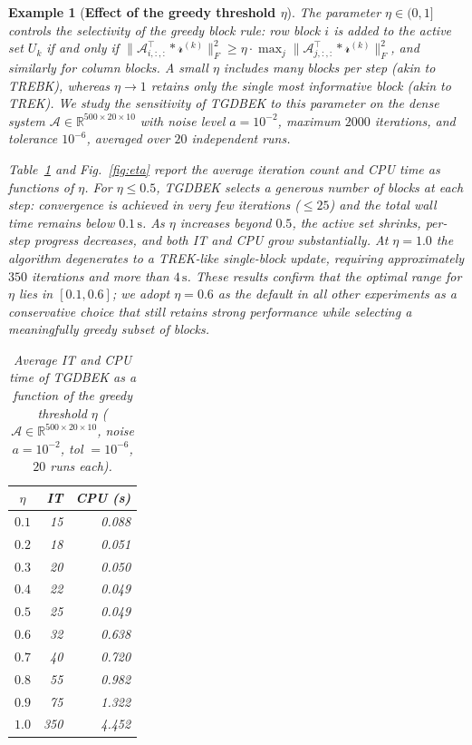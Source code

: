 \documentclass[11pt]{article}
\newtheorem{example}[theorem]{Example}
\def\fm#1{\mathcal{#1}}
\begin{document}
\begin{example}[\textbf{Effect of the greedy threshold $\eta$}] \label{ex:eta}
The parameter $\eta \in (0,1]$ controls the selectivity of the greedy block rule: row block $i$ is added to the active set $U_k$ if and only if $\|\fm A_{i,:,:}^\top * \fm r^{(k)}\|_F^2 \geq \eta \cdot \max_j \|\fm A_{j,:,:}^\top * \fm r^{(k)}\|_F^2$, and similarly for column blocks. A small $\eta$ includes many blocks per step (akin to TREBK), whereas $\eta \to 1$ retains only the single most informative block (akin to TREK). We study the sensitivity of TGDBEK to this parameter on the dense system $\fm A \in \mathbb{R}^{500\times20\times10}$ with noise level $a=10^{-2}$, maximum $2000$ iterations, and tolerance $10^{-6}$, averaged over $20$ independent runs.

Table~\ref{tab:eta} and Fig.~\ref{fig:eta} report the average iteration count and CPU time as functions of $\eta$. For $\eta \leq 0.5$, TGDBEK selects a generous number of blocks at each step: convergence is achieved in very few iterations ($\leq 25$) and the total wall time remains below $0.1\,\mathrm{s}$. As $\eta$ increases beyond $0.5$, the active set shrinks, per-step progress decreases, and both IT and CPU grow substantially. At $\eta = 1.0$ the algorithm degenerates to a TREK-like single-block update, requiring approximately $350$ iterations and more than $4\,\mathrm{s}$. These results confirm that the optimal range for $\eta$ lies in $[0.1, 0.6]$; we adopt $\eta = 0.6$ as the default in all other experiments as a conservative choice that still retains strong performance while selecting a meaningfully greedy subset of blocks.

\begin{table}[ht]
\centering\small\setlength{\tabcolsep}{6pt}
\begin{tabular}{crr}
\toprule
$\eta$ & IT & CPU (s) \\
\midrule
$0.1$ &  15 & 0.088 \\
$0.2$ &  18 & 0.051 \\
$0.3$ &  20 & 0.050 \\
$0.4$ &  22 & 0.049 \\
$0.5$ &  25 & 0.049 \\
$0.6$ &  32 & 0.638 \\
$0.7$ &  40 & 0.720 \\
$0.8$ &  55 & 0.982 \\
$0.9$ &  75 & 1.322 \\
$1.0$ & 350 & 4.452 \\
\bottomrule
\end{tabular}
\caption{Average IT and CPU time of TGDBEK as a function of the greedy threshold $\eta$ ($\fm A\in\mathbb{R}^{500\times20\times10}$, noise $a=10^{-2}$, tol $=10^{-6}$, $20$ runs each).}
\label{tab:eta}
\end{table}
\end{example}
\end{document}
